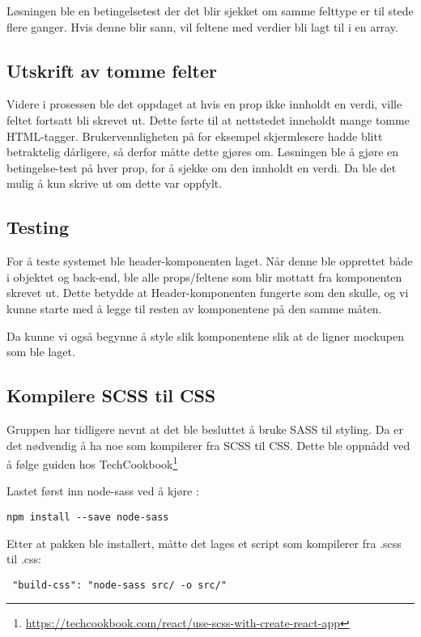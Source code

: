 Løsningen ble en betingelsetest der det blir sjekket om samme felttype er til stede flere ganger. Hvis denne blir sann, vil feltene med verdier bli lagt til i en array. 

\subsection{Utskrift av tomme felter}
Videre i prosessen ble det oppdaget at hvis en prop ikke innholdt en verdi, ville feltet fortsatt bli skrevet ut. Dette førte til at nettstedet inneholdt mange tomme HTML-tagger. Brukervennligheten på for eksempel skjermlesere hadde blitt betraktelig dårligere, så derfor måtte dette gjøres om. Løsningen ble å gjøre en betingelse-test på hver prop, for å sjekke om den innholdt en verdi. Da ble det mulig å kun skrive ut om dette var oppfylt.

\subsection{Testing}
For å teste systemet ble header-komponenten laget. Når denne ble opprettet både i objektet og back-end, ble alle props/feltene som blir mottatt fra komponenten skrevet ut. Dette betydde at Header-komponenten fungerte som den skulle, og vi kunne starte med å legge til resten av komponentene på den samme måten. 

Da kunne vi også begynne å style slik komponentene slik at de ligner mockupen som ble laget.

\subsection{Kompilere SCSS til CSS}
Gruppen har tidligere nevnt at det ble besluttet å bruke SASS til styling. Da er det nødvendig å ha noe som kompilerer fra SCSS til CSS. Dette ble oppnådd ved å følge guiden hos TechCookbook\footnote{\url{https://techcookbook.com/react/use-scss-with-create-react-app}}

Lastet først inn node-sass ved å kjøre :

\begin{lstlisting}
npm install --save node-sass
\end{lstlisting}

Etter at pakken ble installert, måtte det lages et script som kompilerer fra .scss til .css:

\begin{lstlisting}
 "build-css": "node-sass src/ -o src/"
\end{lstlisting}
\clearpage

